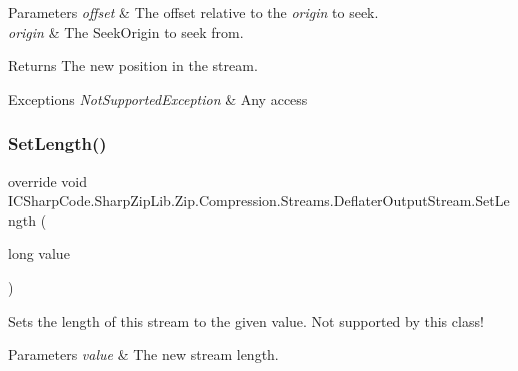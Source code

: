 \begin{DoxyParams}{Parameters}
{\em offset} & The offset relative to the {\itshape origin}  to seek.\\
\hline
{\em origin} & The Seek\+Origin to seek from.\\
\hline
\end{DoxyParams}
\begin{DoxyReturn}{Returns}
The new position in the stream.
\end{DoxyReturn}

\begin{DoxyExceptions}{Exceptions}
{\em Not\+Supported\+Exception} & Any access\\
\hline
\end{DoxyExceptions}
\mbox{\label{class_i_c_sharp_code_1_1_sharp_zip_lib_1_1_zip_1_1_compression_1_1_streams_1_1_deflater_output_stream_a25af9364b271aaa5f24c56ed45934273}} 
\subsubsection{\texorpdfstring{Set\+Length()}{SetLength()}\hspace{0.1cm}{\footnotesize\ttfamily [1/2]}}
{\footnotesize\ttfamily override void I\+C\+Sharp\+Code.\+Sharp\+Zip\+Lib.\+Zip.\+Compression.\+Streams.\+Deflater\+Output\+Stream.\+Set\+Length (\begin{DoxyParamCaption}\item[{long}]{value }\end{DoxyParamCaption})\hspace{0.3cm}{\ttfamily [inline]}}



Sets the length of this stream to the given value. Not supported by this class! 


\begin{DoxyParams}{Parameters}
{\em value} & The new stream length.\\
\hline
\end{DoxyParams}

